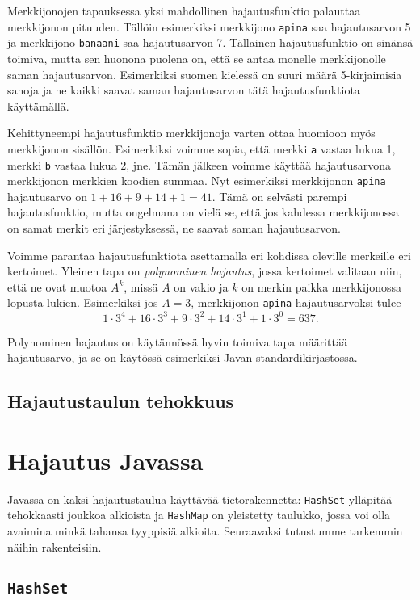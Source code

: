 Merkkijonojen tapauksessa yksi mahdollinen hajautusfunktio
palauttaa merkkijonon pituuden.
Tällöin esimerkiksi merkkijono \texttt{apina} saa
hajautusarvon 5 ja merkkijono \texttt{banaani} saa
hajautusarvon 7.
Tällainen hajautusfunktio on sinänsä toimiva,
mutta sen huonona puolena on, että se antaa monelle
merkkijonolle saman hajautusarvon.
Esimerkiksi suomen kielessä on suuri määrä 5-kirjaimisia
sanoja ja ne kaikki saavat saman hajautusarvon tätä
hajautusfunktiota käyttämällä.

Kehittyneempi hajautusfunktio merkkijonoja varten
ottaa huomioon myös merkkijonon sisällön.
Esimerkiksi voimme sopia, että merkki \texttt{a} vastaa
lukua 1, merkki \texttt{b} vastaa lukua 2, jne.
Tämän jälkeen voimme käyttää hajautusarvona merkkijonon
merkkien koodien summaa.
Nyt esimerkiksi merkkijonon \texttt{apina} hajautusarvo
on $1+16+9+14+1=41$.
Tämä on selvästi parempi hajautusfunktio,
mutta ongelmana on vielä se, että jos kahdessa
merkkijonossa on samat merkit eri järjestyksessä,
ne saavat saman hajautusarvon.

Voimme parantaa hajautusfunktiota asettamalla eri
kohdissa oleville merkeille eri kertoimet.
Yleinen tapa on \emph{polynominen hajautus},
jossa kertoimet valitaan niin, että ne ovat muotoa
$A^k$, missä $A$ on vakio ja $k$ on merkin paikka
merkkijonossa lopusta lukien.
Esimerkiksi jos $A=3$, merkkijonon \texttt{apina}
hajautusarvoksi tulee
\[ 1\cdot3^4+16\cdot3^3+9\cdot3^2+14\cdot3^1+1\cdot3^0 = 637.\]

Polynominen hajautus on käytännössä hyvin toimiva tapa
määrittää hajautusarvo, ja se on käytössä esimerkiksi
Javan standardikirjastossa.

\subsection{Hajautustaulun tehokkuus}

\section{Hajautus Javassa}

Javassa on kaksi hajautustaulua käyttävää tietorakennetta:
\texttt{HashSet} ylläpitää tehokkaasti joukkoa alkioista
ja \texttt{HashMap} on yleistetty taulukko,
jossa voi olla avaimina minkä tahansa tyyppisiä alkioita.
Seuraavaksi tutustumme tarkemmin näihin rakenteisiin.

\subsection{\texttt{HashSet}}

